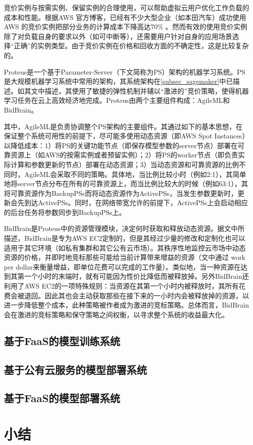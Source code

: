 竞价实例与按需实例、保留实例的合理使用，可以帮助虚拟云用户优化工作负载的成本和性能。根据AWS 官方博客，已经有不少大型企业（如本田汽车）成功使用AWS 的竞价实例把部分业务的计算成本下降高达70\% 。然而有效的使用竞价实例除了对负载自身的要求以外（如可中断等），还需要用户针对自身的应用场景选择“正确”的实例类型。由于竞价实例在价格和回收方面的不确定性，这是比较复杂的。

Proteus是一个基于Parameter-Server（下文简称为PS）架构的机器学习系统。PS是大规模机器学习系统中常用的架构，其系统架构在\ref{subsec_sagemaker}中已描述。如其文中描述，其使用了敏捷的弹性机制并辅以“激进的”竞价策略，使得机器学习任务在云上高效经济地完成。Proteus由两个主要组件构成：AgileML和BidBrain。

其中，AgileML是负责协调整个PS架构的主要组件。其通过如下的基本思想，在保证整个系统可用性的前提下，尽可能多使用动态资源（即AWS Spot Instances）以降低成本：1）将PS的关键功能节点（即保存模型参数的server节点）部署在可靠资源上（如AWS的按需实例或者预留实例）；2）将PS的worker节点（即负责实际计算和参数更新的节点）部署在动态资源；3）当动态资源和可靠资源的比例不同时，AgileML会采取不同的策略。具体地，当比例比较小时（例如2:1），其简单地将server节点分布在所有的可靠资源上，而当比例比较大的时候（例如63:1），其将可靠资源作为BackupPSs而将动态资源作为ActivePSs，当发生参数更新时，更新会先到达ActivePSs。同时，在网络带宽允许的前提下，ActivePSs上会启动相应的后台任务将参数同步到BackupPSs上。

BidBrain是Proteus中的资源管理模块，决定何时获取和释放动态资源。据文中所描述，BidBrain是专为AWS EC2定制的，但是其经过少量的修改和定制化也可以适用于其它环境（如私有集群和其它公有云市场）。其秩序性地监控云市场中动态资源的价格，并即时地竞标那些可能给当前计算带来增益的资源（文中通过 work per dollar来衡量增益，即单位花费可以完成的工作量）。类似地，当一种资源在达到其第一个小时的末端时，就有可能因为性价比降低而被释放掉。另外BidBrain还利用了AWS EC2的一项特殊规则：当资源在其第一个小时内被释放时，其所有花费会被退回。因此其也会主动获取那些在接下来的一小时内会被释放掉的资源，以进一步降低整个成本，此种策略被作者成为激进的竞标策略。总体而言，BidBrain会在激进的竞标策略和保守策略之间权衡，以寻求整个系统的收益最大化。



\subsection{基于FaaS的模型训练系统}

\subsection{基于公有云服务的模型部署系统}

\subsection{基于FaaS的模型部署系统}

\section{小结}
